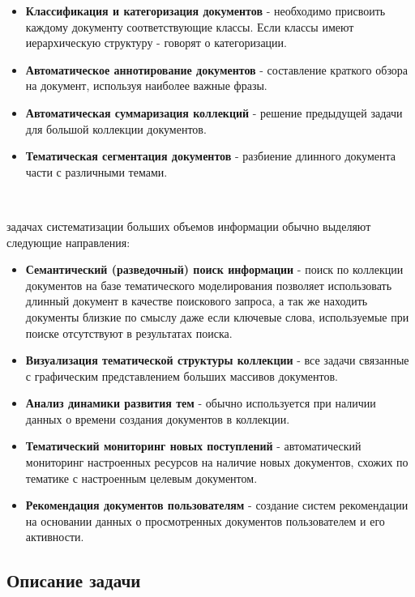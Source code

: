 \begin{itemize}
    \item \textbf{Классификация и категоризация документов} - необходимо присвоить каждому документу соответствующие классы. Если классы имеют иерархическую структуру - говорят о категоризации.
    \item \textbf{Автоматическое аннотирование документов} - составление краткого обзора на документ, используя наиболее важные фразы.
    \item \textbf{Автоматическая суммаризация коллекций} - решение предыдущей задачи для большой коллекции документов.
    \item \textbf{Тематическая сегментация документов} - разбиение длинного документа части с различными темами.
\end{itemize}

~\

 задачах систематизации больших объемов информации обычно выделяют следующие направления:

\begin{itemize}
    \item \textbf{Семантический (разведочный) поиск информации} - поиск по коллекции документов на базе тематического моделирования позволяет использовать длинный документ в качестве поискового запроса, а так же находить документы близкие по смыслу даже если ключевые слова, используемые при поиске отсутствуют в результатах поиска.
    \item \textbf{Визуализация тематической структуры коллекции} - все задачи связанные с графическим представлением больших массивов документов.
    \item \textbf{Анализ динамики развития тем} - обычно используется при наличии данных о времени создания документов в коллекции.
    \item \textbf{Тематический мониторинг новых поступлений} - автоматический мониторинг настроенных ресурсов на наличие новых документов, схожих по тематике с настроенным целевым документом.
    \item \textbf{Рекомендация документов пользователям} - создание систем рекомендации на основании данных о просмотренных документов пользователем и его активности.
\end{itemize}

\subsection{Описание задачи}

